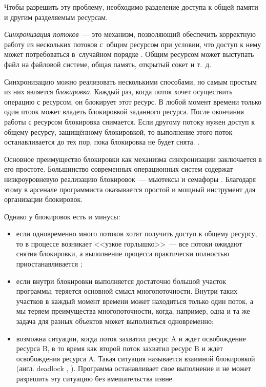 \documentclass[12pt]{report}
\begin{document}
{		Чтобы разрешить эту проблему, необходимо разделение доступа к общей памяти и другим разделяемым ресурсам. 
		
		\textit{Синхронизация потоков}~--- это механизм, позволяющий обеспечить корректную работу из нескольких потоков с~общим ресурсом при условии, что доступ к нему может потребоваться в~случайном порядке \cite{Sync}. Общим ресурсом может выступать файл на файловой системе, общая память, открытый сокет и т.~д.
		
		Синхронизацию можно реализовать несколькими способами, но самым простым из них является \textit{блокировка}. Каждый раз, когда поток хочет осуществить операцию с ресурсом, он блокирует этот ресурс. В любой момент времени только один птоок может владеть блокировкой заданного ресурса. После окончания работы с ресурсом блокировка снимается. Если другому потоку нужен доступ к общему ресурсу, защищённому блокировкой, то выполнение этого поток останавливается до тех пор, пока блокировка не будет снята. \cite{lockmsdn}.
		
		Основное преимущество блокировки как механизма синхронизации заключается в его простоте. Большинство современных операционных систем содержат низкроуровневую реализацию блокировок~--- мьютексы и семафоры \cite{Tanenb}. Благодаря этому в арсенале программиста оказывается простой и мощный инструмент для организации блокировок.
		
		Однако у блокировок есть и минусы:
		
		\begin{itemize}
			\item если одновременно много потоков хотят получить доступ к общему ресурсу, то в процессе возникает <<узкое горлышко>>~--- все потоки ожидают снятия блокировки, а выполнение процесса практически полностью приостанавливается \cite{mutex};
			\item если внутри блокировки выполняется достаточно большой участок программы, теряется основной смысл многопоточности. Внутри таких участков в каждый момент времени может находиться только один поток, а мы теряем преимущества многопоточности, когда, например, одна и та же задача для разных объектов может выполняться одновременно;
			\item возможна ситуации, когда поток захватил ресурс A и ждет освобождение ресурса B, в то время как второй поток захватил ресурс B и ждет освобождения ресурса A. Такая ситуация называется взаимной блокировкой (англ. deadlock \cite{deadlock}, \cite{deadlock2}). Программа  останавливает свое выполнение и не может разрешить эту ситуацию без вмешательства извне.
		\end{itemize}
		
}
\end{document}
